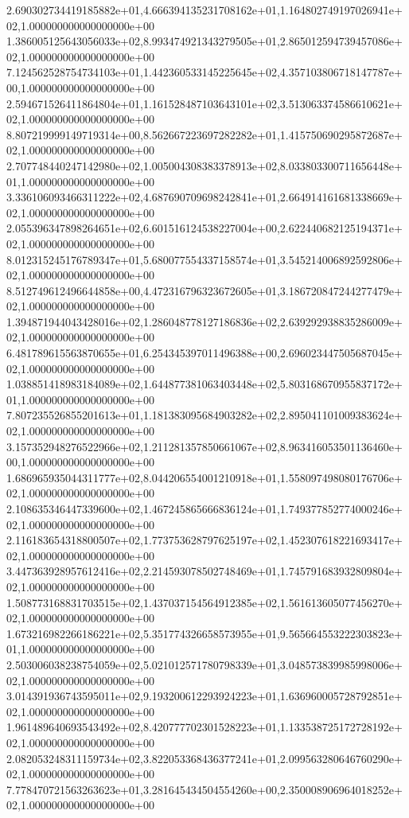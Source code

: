 2.690302734419185882e+01,4.666394135231708162e+01,1.164802749197026941e+02,1.000000000000000000e+00
1.386005125643056033e+02,8.993474921343279505e+01,2.865012594739457086e+02,1.000000000000000000e+00
7.124562528754734103e+01,1.442360533145225645e+02,4.357103806718147787e+00,1.000000000000000000e+00
2.594671526411864804e+01,1.161528487103643101e+02,3.513063374586610621e+02,1.000000000000000000e+00
8.807219999149719314e+00,8.562667223697282282e+01,1.415750690295872687e+02,1.000000000000000000e+00
2.707748440247142980e+02,1.005004308383378913e+02,8.033803300711656448e+01,1.000000000000000000e+00
3.336106093466311222e+02,4.687690709698242841e+01,2.664914161681338669e+02,1.000000000000000000e+00
2.055396347898264651e+02,6.601516124538227004e+00,2.622440682125194371e+02,1.000000000000000000e+00
8.012315245176789347e+01,5.680077554337158574e+01,3.545214006892592806e+02,1.000000000000000000e+00
8.512749612496644858e+00,4.472316796323672605e+01,3.186720847244277479e+02,1.000000000000000000e+00
1.394871944043428016e+02,1.286048778127186836e+02,2.639292938835286009e+02,1.000000000000000000e+00
6.481789615563870655e+01,6.254345397011496388e+00,2.696023447505687045e+02,1.000000000000000000e+00
1.038851418983184089e+02,1.644877381063403448e+02,5.803168670955837172e+01,1.000000000000000000e+00
7.807235526855201613e+01,1.181383095684903282e+02,2.895041101009383624e+02,1.000000000000000000e+00
3.157352948276522966e+02,1.211281357850661067e+02,8.963416053501136460e+00,1.000000000000000000e+00
1.686965935044311777e+02,8.044206554001210918e+01,1.558097498080176706e+02,1.000000000000000000e+00
2.108635346447339600e+02,1.467245865666836124e+01,1.749377852774000246e+02,1.000000000000000000e+00
2.116183654318800507e+02,1.773753628797625197e+02,1.452307618221693417e+02,1.000000000000000000e+00
3.447363928957612416e+02,2.214593078502748469e+01,1.745791683932809804e+02,1.000000000000000000e+00
1.508773168831703515e+02,1.437037154564912385e+02,1.561613605077456270e+02,1.000000000000000000e+00
1.673216982266186221e+02,5.351774326658573955e+01,9.565664553222303823e+01,1.000000000000000000e+00
2.503006038238754059e+02,5.021012571780798339e+01,3.048573839985998006e+02,1.000000000000000000e+00
3.014391936743595011e+02,9.193200612293924223e+01,1.636960005728792851e+02,1.000000000000000000e+00
1.961489640693543492e+02,8.420777702301528223e+01,1.133538725172728192e+02,1.000000000000000000e+00
2.082053248311159734e+02,3.822053368436377241e+01,2.099563280646760290e+02,1.000000000000000000e+00
7.778470721563263623e+01,3.281645434504554260e+00,2.350008906964018252e+02,1.000000000000000000e+00
